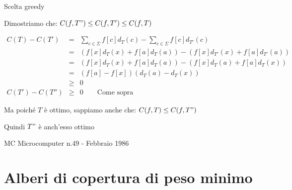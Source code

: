 \begin{frame}[shrink=5]{Scelta greedy}

\BIL
\item Dimostriamo che: $C(f,T") \leq C(f, T') \leq C(f,T)$

\begin{eqnarray*}
C(T) - C(T') &=& \sum_{c \in \Sigma} f[c]d_T(c) - \sum_{c \in \Sigma} f[c]d_{T'}(c) \\
             &=& (f[x]d_T(x)+f[a]d_T(a)) - (f[x]d_{T'}(x)+f[a]d_{T'}(a)) \\
             &=& (f[x]d_T(x)+f[a]d_T(a)) - (f[x]d_{T}(a)+f[a]d_{T}(x)) \\
             &=& (f[a]-f[x])(d_T(a)-d_T(x)) \\
             &\geq& 0 \\
C(T') - C(T'') &\geq& 0 \qquad \textrm{Come sopra}
\end{eqnarray*}

\item Ma poiché $T$ è ottimo, sappiamo anche che: $C(f,T) \leq C(f,T")$
\item Quindi $T"$ è anch'esso ottimo
\EIL

\end{frame}

\begin{OnlySlides}{MC Microcomputer n.49 - Febbraio 1986}


\end{OnlySlides}

\section{Alberi di copertura di peso minimo}

